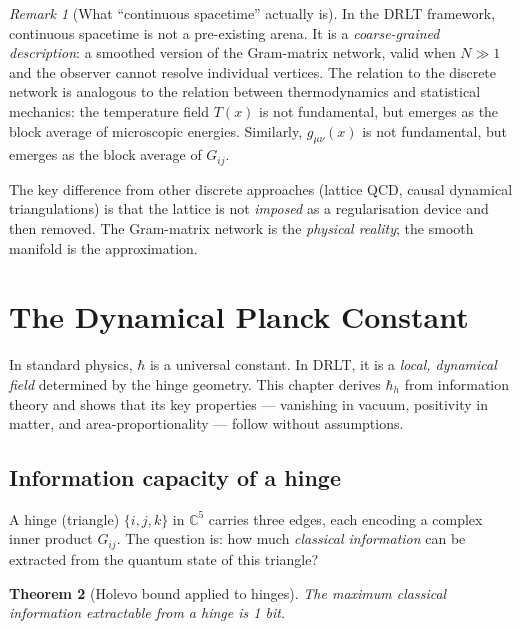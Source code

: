 \documentclass[12pt]{article}
\newtheorem{theorem}{Theorem}[section]
\theoremstyle{remark}
\newtheorem{remark}[theorem]{Remark}
\theoremstyle{definition}
\newcommand{\CC}{\mathbb{C}}
\begin{document}
\begin{remark}[What ``continuous spacetime'' actually is]
In the DRLT framework, continuous spacetime is not a pre-existing arena.  It is a \emph{coarse-grained description}: a smoothed version of the Gram-matrix network, valid when $N \gg 1$ and the observer cannot resolve individual vertices.  The relation to the discrete network is analogous to the relation between thermodynamics and statistical mechanics: the temperature field $T(x)$ is not fundamental, but emerges as the block average of microscopic energies.  Similarly, $g_{\mu\nu}(x)$ is not fundamental, but emerges as the block average of $G_{ij}$.

The key difference from other discrete approaches (lattice QCD, causal dynamical triangulations) is that the lattice is not \emph{imposed} as a regularisation device and then removed.  The Gram-matrix network is the \emph{physical reality}; the smooth manifold is the approximation.
\end{remark}



\section{The Dynamical Planck Constant}
\label{ch:hbar}

In standard physics, $\hbar$ is a universal constant. In DRLT, it is a \emph{local, dynamical field} determined by the hinge geometry. This chapter derives $\hbar_h$ from information theory and shows that its key properties --- vanishing in vacuum, positivity in matter, and area-proportionality --- follow without assumptions.

\subsection{Information capacity of a hinge}

A hinge (triangle) $\{i, j, k\}$ in $\CC^5$ carries three edges, each encoding a complex inner product $G_{ij}$. The question is: how much \emph{classical information} can be extracted from the quantum state of this triangle?

\begin{theorem}[Holevo bound applied to hinges]
\label{thm:holevo}
The maximum classical information extractable from a hinge is 1 bit.
\end{theorem}
\end{document}
